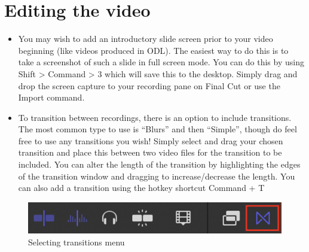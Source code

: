 \documentclass[
]{book}
\begin{document}
\hypertarget{editing-the-video}{%
\section{Editing the video}\label{editing-the-video}}

\begin{itemize}
\item
  You may wish to add an introductory slide screen prior to your video beginning (like videos produced in ODL). The easiest way to do this is to take a screenshot of such a slide in full screen mode. You can do this by using Shift \textgreater{} Command \textgreater{} 3 which will save this to the desktop. Simply drag and drop the screen capture to your recording pane on Final Cut or use the Import command.
\item
  To transition between recordings, there is an option to include transitions. The most common type to use is ``Blurs'' and then ``Simple'', though do feel free to use any transitions you wish! Simply select and drag your chosen transition and place this between two video files for the transition to be included. You can alter the length of the transition by highlighting the edges of the transition window and dragging to increase/decrease the length. You can also add a transition using the hotkey shortcut Command + T
\end{itemize}

\begin{figure}

{\centering \includegraphics[width=0.6\linewidth]{Transition} 

}

\caption{Selecting transitions menu}\label{fig:transition}
\end{figure}
\end{document}
